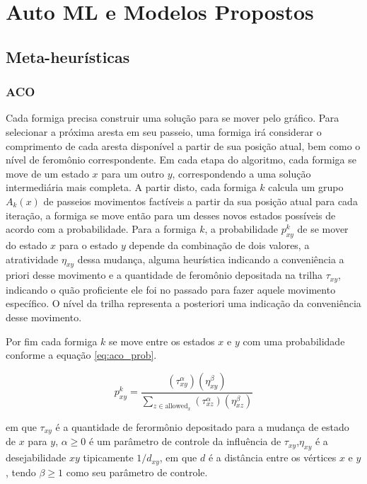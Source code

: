 \chapter{Auto ML e Modelos Propostos}
\label{cap:mod_props}

%
%

\section{Meta-heurísticas}

\subsection{ACO}

Cada formiga precisa construir uma solução para se mover pelo gráfico. Para selecionar a próxima aresta em seu passeio, uma formiga irá considerar o comprimento de cada aresta disponível a partir de sua posição atual, bem como o nível de feromônio correspondente. Em cada etapa do algoritmo, cada formiga se move de um estado $\textit{x}$ para um outro $\textit{y}$, correspondendo a uma solução intermediária mais completa. A partir disto, cada formiga $k$ calcula um grupo $A_{k}(x)$ de passeios movimentos factíveis a partir da sua posição atual para cada iteração, a formiga se move então para um desses novos estados possíveis de acordo com a probabilidade. Para a formiga $k$, a probabilidade $p_{xy}^{k}$ de se mover do estado $x$ para o estado $y$ depende da combinação de dois valores, a atratividade $\eta _{xy}$ dessa mudança, alguma heurística indicando a conveniência a priori desse movimento e a quantidade de feromônio depositada na trilha $\tau _{xy}$, indicando o quão proficiente ele foi no passado para fazer aquele movimento específico. O nível da trilha representa a posteriori uma indicação da conveniência desse movimento.

Por fim cada formiga $k$ se move entre os estados $x$ e $y$ com uma probabilidade conforme a equação \ref{eq:aco_prob}.

\begin{equation}
\label{eq:aco_prob}
    p_{xy}^k =
    \frac
    { (\tau_{xy}^{\alpha}) (\eta_{xy}^{\beta}) }
    { \sum_{z\in \mathrm{allowed}_x} (\tau_{xz}^{\alpha}) (\eta_{xz}^{\beta}) }
\end{equation}

em que $\tau _{xy}$ é a quantidade de ferormônio depositado para a mudança de estado de $x$ para $y$, $\alpha \geq 0$  é um parâmetro de controle da influência de $\tau _{xy}$,$\eta _{xy}$ é a desejabilidade $xy$ tipicamente $1/d_{{xy}}$, em que $d$ é a distância entre os vértices $\textit{x}$ e $\textit{y}$, tendo $\beta  \geq 1$ como seu parâmetro de controle.

